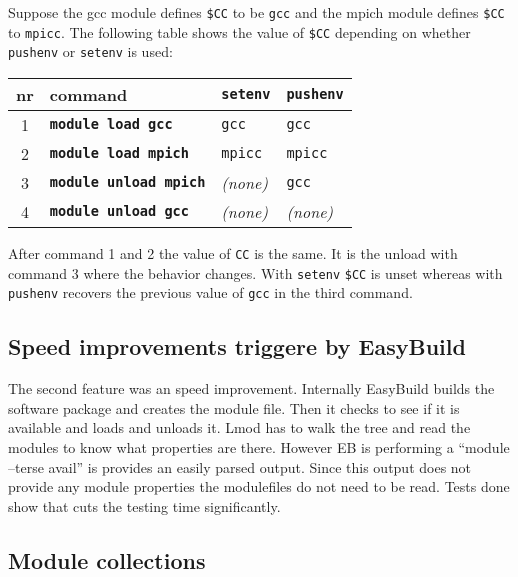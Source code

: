 Suppose the gcc module defines \texttt{\$CC} to be \texttt{gcc} and the mpich module
defines \texttt{\$CC} to \texttt{mpicc}.  The following table shows the value of
\texttt{\$CC} depending on whether \texttt{pushenv} or \texttt{setenv} is used:
\begin{center}
 \begin{tabular}{c|l|l|l}
 nr & command                                 & \texttt{setenv} & \texttt{pushenv}\\
 \hline
 1 & \textbf{\texttt{module load   gcc}}   & \texttt{gcc}    & \texttt{gcc}  \\
 2 & \textbf{\texttt{module load   mpich}} & \texttt{mpicc}  & \texttt{mpicc} \\
 3 & \textbf{\texttt{module unload mpich}} & \emph{(none)}   & \texttt{gcc}  \\
 4 & \textbf{\texttt{module unload gcc}}   & \emph{(none)}   & \emph{(none)} \\
  \hline
    \end{tabular}
\end{center}
\noindent
After command 1 and 2 the value of \texttt{CC} is the same.  It is the unload
with command 3 where the behavior changes.  With \texttt{setenv} \texttt{\$CC} is unset
whereas with \texttt{pushenv} recovers the previous value of
\texttt{gcc} in the third command.


\subsection{Speed improvements triggere by EasyBuild}

The second feature was an speed improvement.  Internally EasyBuild
builds the software package and creates the module file.  Then it
checks to see if it is available and loads and unloads it.  Lmod has
to walk the tree and read the modules to know what properties are
there. However EB is performing a ``module --terse avail'' is provides
an easily parsed output.  Since this output does not provide any
module properties the modulefiles do not need to be read.  Tests done
show that cuts the testing time significantly.

\subsection{Module collections}

